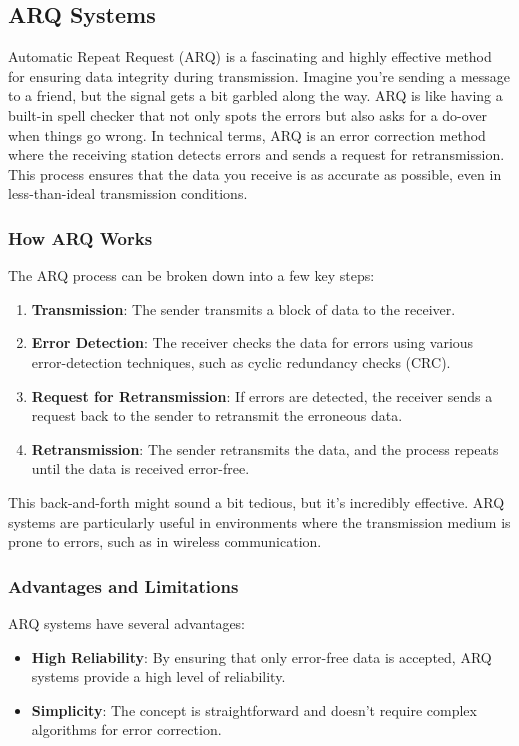 \subsection{ARQ Systems}
\label{subsec:arq-systems}

Automatic Repeat Request (ARQ) is a fascinating and highly effective method for ensuring data integrity during transmission. Imagine you're sending a message to a friend, but the signal gets a bit garbled along the way. ARQ is like having a built-in spell checker that not only spots the errors but also asks for a do-over when things go wrong. In technical terms, ARQ is an error correction method where the receiving station detects errors and sends a request for retransmission. This process ensures that the data you receive is as accurate as possible, even in less-than-ideal transmission conditions.

\subsubsection*{How ARQ Works}
The ARQ process can be broken down into a few key steps:
\begin{enumerate}
    \item \textbf{Transmission}: The sender transmits a block of data to the receiver.
    \item \textbf{Error Detection}: The receiver checks the data for errors using various error-detection techniques, such as cyclic redundancy checks (CRC).
    \item \textbf{Request for Retransmission}: If errors are detected, the receiver sends a request back to the sender to retransmit the erroneous data.
    \item \textbf{Retransmission}: The sender retransmits the data, and the process repeats until the data is received error-free.
\end{enumerate}

This back-and-forth might sound a bit tedious, but it's incredibly effective. ARQ systems are particularly useful in environments where the transmission medium is prone to errors, such as in wireless communication.

\subsubsection*{Advantages and Limitations}
ARQ systems have several advantages:
\begin{itemize}
    \item \textbf{High Reliability}: By ensuring that only error-free data is accepted, ARQ systems provide a high level of reliability.
    \item \textbf{Simplicity}: The concept is straightforward and doesn't require complex algorithms for error correction.
\end{itemize}

